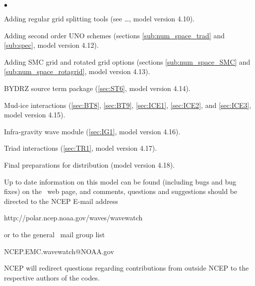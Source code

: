 \begin{list}{$\bullet$}{\rightmargin 5mm \parsep 0mm \itemsep 0mm}
\item Adding regular grid splitting tools (see \para\ldots, model version
  4.10).

\item Adding second order UNO schemes (sections \ref{sub:num_space_trad} and
  \ref{sub:spec}, model version 4.12).

\item Adding SMC grid and rotated grid options (sections
  \ref{sub:num_space_SMC} and \ref{sub:num_space_rotagrid}, model version
  4.13).

\item BYDRZ source term package (\para\ref{sec:ST6}, model version 4.14).

\item Mud-ice interactions (\para\ref{sec:BT8}, \ref{sec:BT9},
 \ref{sec:ICE1}, \ref{sec:ICE2}, and \ref{sec:ICE3}, model version 4.15).

\item Infra-gravity wave module (\para\ref{sec:IG1}, model version 4.16).

\item Triad interactions (\para\ref{sec:TR1}, model version 4.17).



\item Final preparations for distribution (model version 4.18).

\end{list}

\vspace{\baselineskip} \noindent 
Up to date information on this model can be found (including bugs and bug
fixes) on the \ws\ web page, and comments, questions and suggestions should be
directed to the NCEP E-mail address

\begin{center}
http://polar.ncep.noaa.gov/waves/wavewatch
\end{center}

\noindent
or to the general \ws\ mail group list

\begin{center}
NCEP.EMC.wavewatch@NOAA.gov
\end{center}

\noindent
NCEP will redirect questions regarding contributions from outside NCEP to the
respective authors of the codes.
